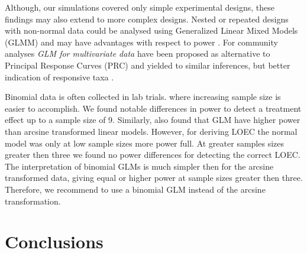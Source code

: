 \documentclass{scrartcl}
\begin{document}
Although, our simulations covered only simple experimental designs, these findings may also extend to more complex designs. 
Nested or repeated designs with non-normal data could be analysed using Generalized Linear Mixed Models (GLMM) and may have advantages with respect to power \citep{stroup_rethinking_2014}.
For community analyses \emph{GLM for multivariate data} have been proposed as alternative to Principal Response Curves (PRC) and yielded to similar inferences, but better indication of responsive taxa \citep{warton_distance-based_2012,szocs_analysing_2015}.

Binomial data is often collected in lab trials. where increasing sample size is easier to accomplish. 
We found notable differences in power to detect a treatment effect up to a sample size of 9.
Similarly, \citet{warton_arcsine_2011} also found that GLM have higher power than arcsine transformed linear models.
However, for deriving LOEC the normal model was only at low sample sizes more power full. At greater samples sizes greater then three we found no power differences for detecting the correct LOEC.
The interpretation of binomial GLMs is much simpler then for the arcsine transformed data, giving equal or higher power at sample sizes greater then three. 
Therefore, we recommend to use a binomial GLM instead of the arcsine transformation.
















\section{Conclusions}





\end{document}
